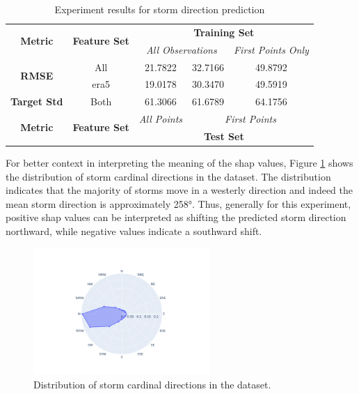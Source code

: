 \begin{table}[ht]
\centering
\caption{Experiment results for storm direction prediction}
\label{tab:storm_direction_results}
\begin{tabular}{|c|c|c|c|c|}
\hline
\multirow{2}{*}{\textbf{Metric}} & \multirow{2}{*}{\textbf{Feature Set}} & \multicolumn{3}{c|}{\textbf{Training Set} } \\ \cline{3-5}
 & & \multicolumn{2}{c|}{\textit{All Observations}} & \textit{First Points Only} \\
\hline \hline
\multirow{2}{*}{\textbf{RMSE}} & All & 21.7822 & 32.7166 & 49.8792 \\
 & \acrshort{era5} & 19.0178 & 30.3470 & 49.5919 \\
\hline
\textbf{Target Std} & Both & 61.3066 & 61.6789 & 64.1756 \\
\hline \hline
\multirow{2}{*}{\textbf{Metric}} & \multirow{2}{*}{\textbf{Feature Set}} & \textit{All Points} & \multicolumn{2}{c|}{\textit{First Points}} \\ \cline{3-5}
 & & \multicolumn{3}{c|}{\textbf{Test Set}} \\ 
\hline
\end{tabular}
\end{table}

For better context in interpreting the meaning of the \acrshort{shap} values, Figure \ref{fig:storm_cardinal_directions_distribution} shows the distribution of storm cardinal directions in the dataset. The distribution indicates that the majority of storms move in a westerly direction and indeed the mean storm direction is approximately \ang{258}. Thus, generally for this experiment, positive \acrshort{shap} values can be interpreted as shifting the predicted storm direction northward, while negative values indicate a southward shift.

\begin{figure}[ht]
    \centering
    \includegraphics[width=0.6\textwidth]{../figures/generated/exploration/storm_cardinal_directions_distribution.png}
    \caption{Distribution of storm cardinal directions in the dataset.}
    \label{fig:storm_cardinal_directions_distribution}
\end{figure}

